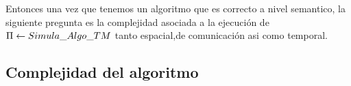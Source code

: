 \documentclass[10pt]{report}
\begin{document}
    Entonces una vez que tenemos un algoritmo que es correcto a nivel semantico,
    la siguiente pregunta es la complejidad asociada a la ejecución de $\Pi \gets Simula\char95Algo\char95TM$
    tanto espacial,de comunicación asi como temporal.
    \newpage
    \subsection{Complejidad del algoritmo}\label{subsec:complejidad-del-algoritmo}
\end{document}
